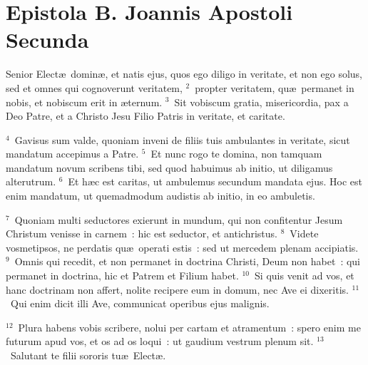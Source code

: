 {\centering \section*{Epistola B. Joannis Apostoli Secunda}}\thispagestyle{empty}

\noindent Senior Elect\ae\ domin\ae , et natis ejus, quos ego diligo in veritate, et non ego solus, sed et omnes qui cognoverunt veritatem,
${}^{2}$~propter veritatem, qu\ae\ permanet in nobis, et nobiscum erit in \ae ternum.
${}^{3}$~Sit vobiscum gratia, misericordia, pax a Deo Patre, et a Christo Jesu Filio Patris in veritate, et caritate.


${}^{4}$~Gavisus sum valde, quoniam inveni de filiis tuis ambulantes in veritate, sicut mandatum accepimus a Patre.
${}^{5}$~Et nunc rogo te domina, non tamquam mandatum novum scribens tibi, sed quod habuimus ab initio, ut diligamus alterutrum.
${}^{6}$~Et h\ae c est caritas, ut ambulemus secundum mandata ejus. Hoc est enim mandatum, ut quemadmodum audistis ab initio, in eo ambuletis.


${}^{7}$~Quoniam multi seductores exierunt in mundum, qui non confitentur Jesum Christum venisse in carnem~: hic est seductor, et antichristus.
${}^{8}$~Videte vosmetipsos, ne perdatis qu\ae\ operati estis~: sed ut mercedem plenam accipiatis.
${}^{9}$~Omnis qui recedit, et non permanet in doctrina Christi, Deum non habet~: qui permanet in doctrina, hic et Patrem et Filium habet.
${}^{10}$~Si quis venit ad vos, et hanc doctrinam non affert, nolite recipere eum in domum, nec Ave ei dixeritis.
${}^{11}$~Qui enim dicit illi Ave, communicat operibus ejus malignis.


${}^{12}$~Plura habens vobis scribere, nolui per cartam et atramentum~: spero enim me futurum apud vos, et os ad os loqui~: ut gaudium vestrum plenum sit.
${}^{13}$~Salutant te filii sororis tu\ae\ Elect\ae .
